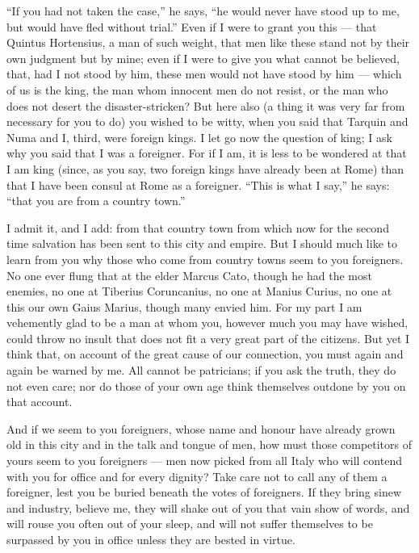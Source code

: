  ``If you had not taken the case,'' he says, ``he would never have stood up to me, but would have fled without trial.'' Even if I were to grant you this --- that Quintus Hortensius, a man of such weight, that men like these stand not by their own judgment but by mine; even if I were to give you what cannot be believed, that, had I not stood by him, these men would not have stood by him --- which of us is the king, the man whom innocent men do not resist, or the man who does not desert the disaster-stricken? But here also (a thing it was very far from necessary for you to do) you wished to be witty, when you said that Tarquin and Numa and I, third, were foreign kings. I let go now the question of king; I ask why you said that I was a foreigner. For if I am, it is less to be wondered at that I am king (since, as you say, two foreign kings have already been at Rome) than that I have been consul at Rome as a foreigner. ``This is what I say,'' he says: ``that you are from a country town.''

 I admit it, and I add: from that country town from which now for the second time salvation has been sent to this city and empire. But I should much like to learn from you why those who come from country towns seem to you foreigners. No one ever flung that at the elder Marcus Cato, though he had the most enemies, no one at Tiberius Coruncanius, no one at Manius Curius, no one at this our own Gaius Marius, though many envied him. For my part I am vehemently glad to be a man at whom you, however much you may have wished, could throw no insult that does not fit a very great part of the citizens. But yet I think that, on account of the great cause of our connection, you must again and again be warned by me. All cannot be patricians; if you ask the truth, they do not even care; nor do those of your own age think themselves outdone by you on that account.

 And if we seem to you foreigners, whose name and honour have already grown old in this city and in the talk and tongue of men, how must those competitors of yours seem to you foreigners --- men now picked from all Italy who will contend with you for office and for every dignity? Take care not to call any of them a foreigner, lest you be buried beneath the votes of foreigners. If they bring sinew and industry, believe me, they will shake out of you that vain show of words, and will rouse you often out of your sleep, and will not suffer themselves to be surpassed by you in office unless they are bested in virtue.

